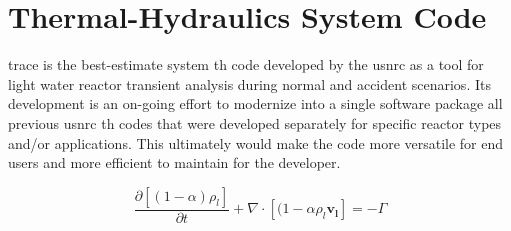 \section{Thermal-Hydraulics System Code }\label{sec:reflood_trace}

\gls{trace} is the best-estimate system \gls{th} code developed by the \gls{usnrc} 
as a tool for light water reactor transient analysis during normal and accident scenarios.
Its development is an on-going effort 
to modernize into a single software package all previous \gls{usnrc} \gls{th} codes
that were developed separately for specific reactor types and/or applications.
This ultimately would make the code more versatile for end users and more efficient to maintain for the developer.

\begin{equation}
	\frac{\partial [(1-\alpha)\rho_l]}{\partial t} + \nabla \cdot [(1-\alpha \rho_l \mathbf{v_l}] = - \Gamma
\label{eq:}
\end{equation}